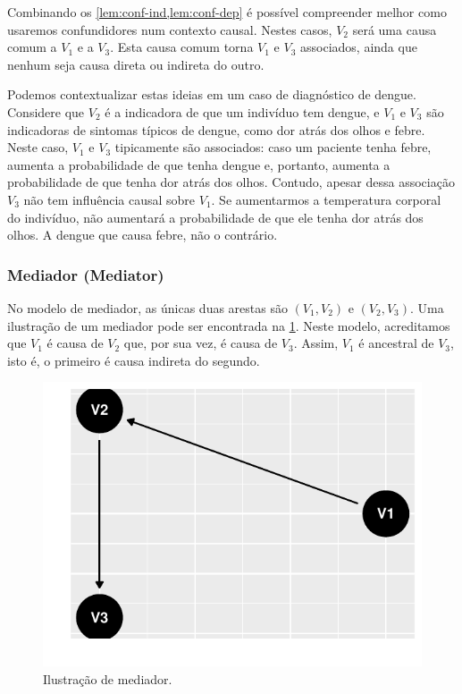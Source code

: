 Combinando os \cref{lem:conf-ind,lem:conf-dep} é 
possível compreender melhor como 
usaremos confundidores num contexto causal.
Nestes casos, $V_2$ será uma causa comum a $V_1$ e a $V_3$.
Esta causa comum torna $V_1$ e $V_3$ associados,
ainda que nenhum seja causa direta ou indireta do outro.

Podemos contextualizar estas ideias
em um caso de diagnóstico de dengue.
Considere que 
$V_2$ é a indicadora de que um indivíduo tem dengue, e
$V_1$ e $V_3$ são indicadoras de sintomas típicos de dengue, como
dor atrás dos olhos e febre.
Neste caso, $V_1$ e $V_3$ tipicamente são associados:
caso um paciente tenha febre,
aumenta a probabilidade de que tenha dengue e, portanto,
aumenta a probabilidade de que tenha dor atrás dos olhos.
Contudo, apesar dessa associação 
$V_3$ não tem influência causal sobre $V_1$.
Se aumentarmos a temperatura corporal do indivíduo,
não aumentará a probabilidade de que ele tenha dor atrás dos olhos.
A dengue que causa febre, não o contrário.

\subsubsection{Mediador (Mediator)}

No modelo de mediador, 
as únicas duas arestas são 
$(V_1, V_2)$ e $(V_2, V_3)$.
Uma ilustração de um mediador
pode ser encontrada 
na \cref{fig:mediador}.
Neste modelo, acreditamos que 
$V_1$ é causa de $V_2$ que,
por sua vez, é causa de $V_3$.
Assim, $V_1$ é ancestral de $V_3$,
isto é, o primeiro é 
causa indireta do segundo.


\begin{knitrout}
\color{fgcolor}\begin{figure}[t]

{\centering \includegraphics[width=\maxwidth]{figure/mediador-1} 

}

\caption[Ilustração de mediador]{Ilustração de mediador.}\label{fig:mediador}
\end{figure}

\end{knitrout}

